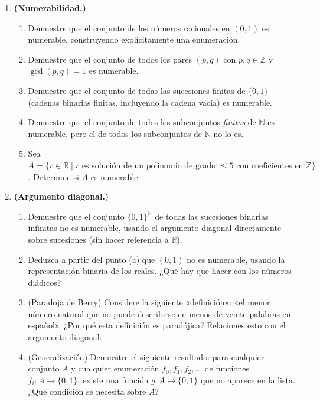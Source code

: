 \begin{enumerate}[leftmargin=2.5em, label=\textbf{\arabic*.}]
  \item \textbf{(Numerabilidad.)}
  \begin{enumerate}[label=(\alph*)]
    \item Demuestre que el conjunto de los números racionales en $(0,1)$ es numerable, construyendo explícitamente una enumeración.
    \item Demuestre que el conjunto de todos los pares $(p, q)$ con $p, q \in \mathbb{Z}$ y $\gcd(p,q) = 1$ es numerable.
    \item Demuestre que el conjunto de todas las sucesiones finitas de $\{0,1\}$ (cadenas binarias finitas, incluyendo la cadena vacía) es numerable.
    \item Demuestre que el conjunto de todos los subconjuntos \emph{finitos} de $\mathbb{N}$ es numerable, pero el de todos los subconjuntos de $\mathbb{N}$ no lo es.
    \item Sea $A = \{r \in \mathbb{R} \mid r \text{ es solución de un polinomio de grado } \leq 5 \text{ con coeficientes en } \mathbb{Z}\}$. Determine si $A$ es numerable.
  \end{enumerate}

  \item \textbf{(Argumento diagonal.)}
  \begin{enumerate}[label=(\alph*)]
    \item Demuestre que el conjunto $\{0,1\}^{\mathbb{N}}$ de todas las sucesiones binarias infinitas no es numerable, usando el argumento diagonal directamente sobre sucesiones (sin hacer referencia a $\mathbb{R}$).
    \item Deduzca a partir del punto (a) que $(0,1)$ no es numerable, usando la representación binaria de los reales. ¿Qué hay que hacer con los números diádicos?
    \item (Paradoja de Berry) Considere la siguiente «definición»: «el menor número natural que no puede describirse en menos de veinte palabras en español». ¿Por qué esta definición es paradójica? Relaciones esto con el argumento diagonal.
    \item (Generalización) Demuestre el siguiente resultado: para cualquier conjunto $A$ y cualquier enumeración $f_0, f_1, f_2, \ldots$ de funciones $f_i: A \to \{0,1\}$, existe una función $g: A \to \{0,1\}$ que no aparece en la lista. ¿Qué condición se necesita sobre $A$?
  \end{enumerate}


\end{enumerate}
